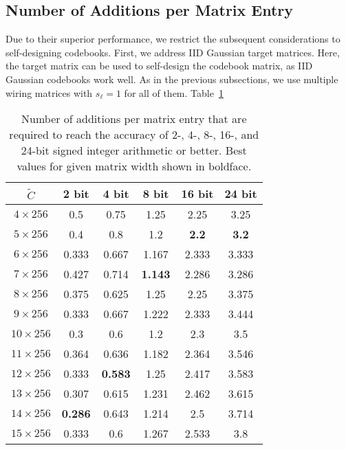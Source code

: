 \documentclass[twocolumn]{IEEEtran}
\begin{document}
\subsection{Number of Additions per Matrix Entry}

Due to their superior performance, we restrict the subsequent considerations to self-designing codebooks.
First, we address IID Gaussian target matrices. Here, the target matrix can be used to self-design the codebook matrix, as IID Gaussian codebooks work well. As in the previous subsections, we use multiple wiring matrices with $s_\ell=1$ for all of them.
Table~\ref{rect}
\begin{table}
\begin{center}
\caption{Number of additions per matrix entry that are required to reach the accuracy of 2-, 4-, 8-, 16-, and 24-bit signed integer arithmetic or better. Best values for given matrix width shown in boldface.
\label{rect}}
\begin{tabular}{||c||c|c|c|c|c|}
\hline
$\tilde C$ & 2 bit & 4 bit & 8 bit & 16 bit & 24 bit\\
\hline\hline
$4\times 256$ &0.5 &0.75 & 1.25 &  2.25 &3.25  \\
$5\times 256$ & 0.4 &0.8  & 1.2 &\bf 2.2&\bf 3.2\\
$6\times 256$ & 0.333 &0.667  & 1.167 &2.333&3.333\\
$7\times 256$ & 0.427 &0.714 &  \bf 1.143 &  2.286 & 3.286  \\
$8\times 256$ & 0.375 &0.625 &  1.25 &  2.25 & 3.375  \\
$9\times 256$ & 0.333 &0.667 &  1.222 & 2.333 &3.444   \\
$10\times 256$ & 0.3 & 0.6 &  1.2 &   2.3& 3.5    \\
$11\times 256$ & 0.364 & 0.636 &   1.182 &   2.364& 3.546    \\
$12\times 256$ & 0.333 & \bf 0.583 &  1.25 &   2.417& 3.583    \\
$13\times 256$ & 0.307 & 0.615 &  1.231 &   2.462& 3.615    \\
$14\times 256$ & \bf 0.286 & 0.643 &  1.214 &   2.5& 3.714    \\
$15\times 256$ & 0.333 & 0.6 &  1.267 &   2.533& 3.8   \\
\hline\hline

\end{tabular}
\end{center}
\end{table}
\end{document}
